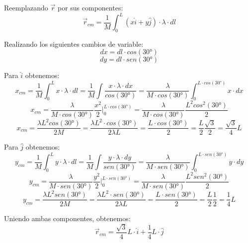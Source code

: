 \documentclass[letter,11pt]{article}
\begin{document}
Reemplazando $\vec{r}$ por sus componentes:
\begin{equation*}
    \vec{r}_{cm} = \frac{1}{M} \int_{0}^{L} (x \hat{i} + y \hat{j}) \cdot \lambda \cdot dl
\end{equation*}

Realizando los siguientes cambios de variable:
\begin{equation}
    dx = dl \cdot cos(30\si{\degree})
\label{dx}
\end{equation}
\begin{equation}
    dy = dl \cdot sen(30\si{\degree})
\label{dy}
\end{equation}

Para $\hat{i}$ obtenemos:
\begin{equation*}
    x_{cm} = \frac{1}{M} \int_{0}^{L} x \cdot \lambda \cdot dl = \frac{1}{M} \int \frac{x \cdot \lambda \cdot dx}{cos(30\si{\degree})} = \frac{\lambda}{M \cdot cos(30\si{\degree})} \int_{0}^{L \cdot cos(30\si{\degree})} x \cdot dx
\end{equation*}
\begin{equation*}
    x_{cm} = \frac{\lambda}{M \cdot cos(30\si{\degree})} \frac{x^2}{2}\Biggr|_{0}^{L \cdot cos(30\si{\degree})} = \frac{\lambda}{M \cdot cos(30\si{\degree})} \frac{L^2 cos^2(30\si{\degree})}{2} 
\end{equation*}
\begin{equation*}
    x_{cm} = \frac{\lambda L^2 cos(30\si{\degree})}{2 M} = \frac{\lambda L^2 \cdot cos(30\si{\degree})}{2 \lambda L} = \frac{L \cdot cos(30\si{\degree})}{2} = \frac{L}{2} \frac{\sqrt{3}}{2} = \frac{\sqrt{3}}{4} L
\end{equation*}

Para $\hat{j}$ obtenemos:
\begin{equation*}
    y_{cm} = \frac{1}{M} \int_{0}^{L} y \cdot \lambda \cdot dl = \frac{1}{M} \int \frac{y \cdot \lambda \cdot dy}{sen(30\si{\degree})} = \frac{\lambda}{M \cdot sen(30\si{\degree})} \int_{0}^{L \cdot sen(30\si{\degree})} y \cdot dy
\end{equation*}
\begin{equation*}
    y_{cm} = \frac{\lambda}{M \cdot sen(30\si{\degree})} \frac{y^2}{2}\Biggr|_{0}^{L \cdot sen(30\si{\degree})} = \frac{\lambda}{M \cdot sen(30\si{\degree})} \frac{L^2 sen^2(30\si{\degree})}{2} 
\end{equation*}
\begin{equation*}
    y_{cm} = \frac{\lambda L^2 sen(30\si{\degree})}{2 M} = \frac{\lambda L^2 \cdot sen(30\si{\degree})}{2 \lambda L} = \frac{L \cdot sen(30\si{\degree})}{2} = \frac{L}{2} \frac{1}{2} = \frac{1}{4} L
\end{equation*}

\vspace{1.0cm}
Uniendo ambas componentes, obtenemos:
\begin{equation}
    \vec{r}_{cm} = \frac{\sqrt{3}}{4} L \cdot \hat{i} + \frac{1}{4} L \cdot \hat{j}
\end{equation}
\end{document}
